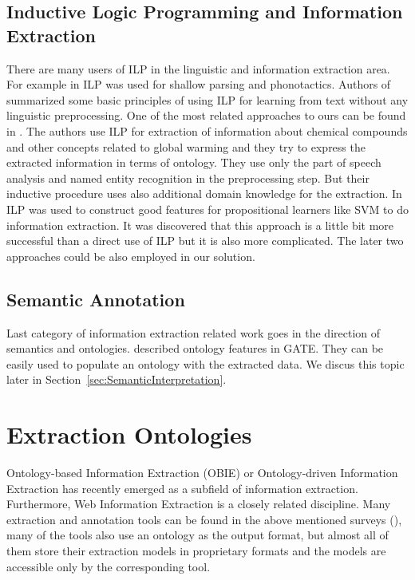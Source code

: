 \subsection{Inductive Logic Programming and Information Extraction}
There are many users of ILP in the linguistic and information extraction area.
For example in \citep{stasinos:phd} ILP was used for shallow parsing and phonotactics.
Authors of \citep{Junker99learningfor} summarized some basic principles of using ILP for learning from text without any linguistic preprocessing. One of the most related approaches to ours can be found in \citep{aitken02:_learn_infor_extrac_rules}. The authors use ILP for extraction of information about chemical compounds and other concepts related to global warming and they try to express the extracted information in terms of ontology. They use only the part of speech analysis and named entity recognition in the preprocessing step. But their inductive procedure uses also additional domain knowledge for the extraction. In \citep{DBLP:conf/ilp/RamakrishnanJBS07} ILP was used to construct good features for propositional learners like SVM to do information extraction. It was discovered that this approach is a little bit more successful than a direct use of ILP but it is also more complicated. The later two approaches could be also employed in our solution.



\subsection{Semantic Annotation}
Last category of information extraction related work goes in the direction of semantics and ontologies. \cite{Bon04b} described  ontology features in GATE. They can be easily used to populate an ontology with the extracted data. We discus this topic later in Section~\ref{sec:SemanticInterpretation}.



\section{Extraction Ontologies} \label{sec:relwork_ext_ont}

Ontology-based Information Extraction (OBIE) \citep{citeulike:7291004} or Ontology-driven Information Extraction \citep{Yildiz:2007:OMO:1793154.1793216} has recently emerged as a subfield of information extraction. Furthermore, Web Information Extraction \citep{DBLP:journals/tkde/ChangKGS06} is a closely related discipline. Many extraction and annotation tools can be found in the above mentioned surveys (\citep{citeulike:7291004,DBLP:journals/tkde/ChangKGS06}), many of the tools also use an ontology as the output format, but almost all of them store their extraction models in proprietary formats and the models are accessible only by the corresponding tool.

